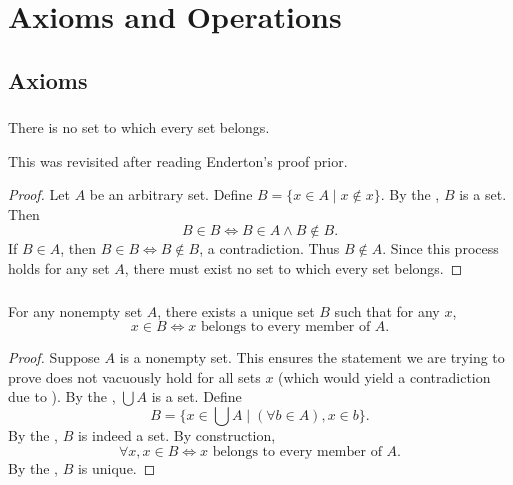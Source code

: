 \documentclass{report}
\begin{document}
\chapter{Axioms and Operations}%

\section{Axioms}%

\subsection{}%

  \begin{theorem}[2A]
    There is no set to which every set belongs.
  \end{theorem}

  \begin{note}
    This was revisited after reading Enderton's proof prior.
  \end{note}

  \begin{proof}
    Let $A$ be an arbitrary set.
    Define $B = \{ x \in A \mid x \not\in x \}$.
    By the , $B$ is a set.
    Then $$B \in B \iff B \in A \land B \not\in B.$$
    If $B \in A$, then $B \in B \iff B \not\in B$, a contradiction.
    Thus $B \not\in A$.
    Since this process holds for any set $A$, there must exist no set to which
      every set belongs.
  \end{proof}

\subsection{}%

  \begin{theorem}[2B]
    For any nonempty set $A$, there exists a unique set $B$ such that for any
      $x$, $$x \in B \iff x \text{ belongs to every member of } A.$$
  \end{theorem}

  \begin{proof}
    Suppose $A$ is a nonempty set.
    This ensures the statement we are trying to prove does not vacuously hold for
      all sets $x$ (which would yield a contradiction due to
      ).
    By the , $\bigcup A$ is a set.
    Define $$B = \{ x \in \bigcup A \mid (\forall b \in A), x \in b \}.$$
    By the , $B$ is indeed a set.
    By construction,
      $$\forall x, x \in B \iff x \text{ belongs to every member of } A.$$
    By the , $B$ is unique.
  \end{proof}
\end{document}
